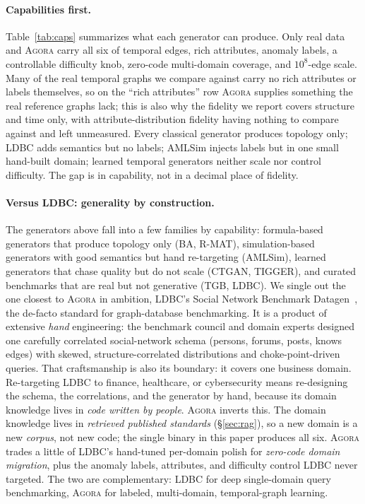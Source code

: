\documentclass[sigconf,review,anonymous]{acmart}
\newcommand{\sys}{\textsc{Agora}\xspace}
\begin{document}
\paragraph{Capabilities first.}
Table~\ref{tab:caps} summarizes what each generator can produce. Only real data
and \sys{} carry all six of temporal edges, rich attributes, anomaly labels, a
controllable difficulty knob, zero-code multi-domain coverage, and $10^8$-edge scale.
Many of the real temporal graphs we compare against carry no rich attributes or labels
themselves, so on the ``rich attributes'' row \sys{} supplies something the real
reference graphs lack; this is also why the fidelity we report covers structure and time
only, with attribute-distribution fidelity having nothing to compare against and left
unmeasured. Every classical generator produces topology only; LDBC adds semantics but no
labels; AMLSim injects labels but in one small hand-built domain; learned temporal
generators neither scale nor control difficulty. The gap is in capability, not in a
decimal place of fidelity.

\paragraph{Versus LDBC: generality by construction.}
The generators above fall into a few families by capability: formula-based generators
that produce topology only (BA, R-MAT), simulation-based generators with good semantics
but hand re-targeting (AMLSim), learned generators that chase quality but do not scale
(CTGAN, TIGGER), and curated benchmarks that are real but not generative (TGB, LDBC). We
single out the one closest to \sys{} in ambition, LDBC's Social Network Benchmark
Datagen~\cite{erling2015ldbc,pham2012s3g2}, the de-facto standard for graph-database
benchmarking. It is a product of extensive \emph{hand} engineering: the benchmark council and
domain experts designed one carefully correlated social-network schema (persons, forums,
posts, \textsf{knows} edges) with skewed, structure-correlated distributions and
choke-point-driven queries. That craftsmanship is also its boundary: it covers one
business domain. Re-targeting LDBC to finance, healthcare, or cybersecurity means
re-designing the schema, the correlations, and the generator by hand, because its domain
knowledge lives in \emph{code written by people}. \sys{} inverts this. The domain
knowledge lives in \emph{retrieved published standards} (\S\ref{sec:rag}), so a new
domain is a new \emph{corpus}, not new code; the single binary in this paper produces
all six. \sys{} trades a little of LDBC's hand-tuned per-domain polish for \emph{zero-code
domain migration}, plus the anomaly labels, attributes, and difficulty control LDBC never
targeted. The two are complementary: LDBC for deep single-domain query benchmarking,
\sys{} for labeled, multi-domain, temporal-graph learning.
\end{document}
